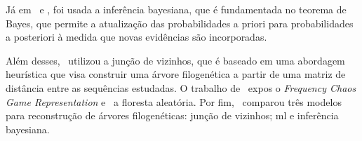 Já em~\textit{} e \textit{}, foi usada a inferência bayesiana, que é fundamentada no teorema de Bayes, que permite a atualização das probabilidades a priori para probabilidades a posteriori à medida que novas evidências são incorporadas.

Além desses,~\textit{\citeauthor{potdar_phylogenetic_2021}} utilizou a junção de vizinhos, que é baseado em uma abordagem heurística que visa construir uma árvore filogenética a partir de uma matriz de distância entre as sequências estudadas. O trabalho de~ expos o \textit{Frequency Chaos Game Representation} e~\textit{} a floresta aleatória. Por fim,~\textit{} comparou três modelos para reconstrução de árvores filogenéticas: junção de vizinhos; \gls{ml} e inferência bayesiana.